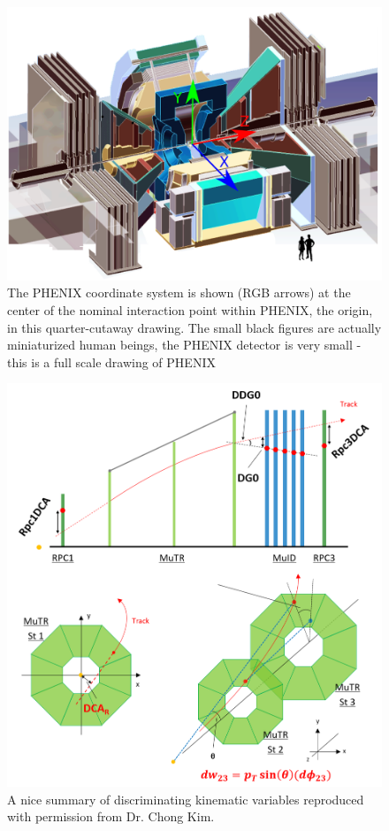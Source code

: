 \begin{figure}
  \centering
  \includegraphics[width=0.8\linewidth]{./figures/phenix_coordinate_system.png}
  \caption{
    The PHENIX coordinate system is shown (RGB arrows) at the center of the
    nominal interaction point within PHENIX, the origin, in this quarter-cutaway
    drawing. The small black figures are actually miniaturized human beings, the
    PHENIX detector is very small - this is a full scale drawing of 
    PHENIX~\cite{WebPHENIXDrawings}
  }
  \label{fig:phenix_coordinate_system}

\end{figure}


\begin{figure}
  \centering
  \includegraphics[width=0.8\linewidth]{./figures/kinematic_variables_schematic.png}
  \caption{
    A nice summary of discriminating kinematic variables reproduced with
    permission from Dr. Chong Kim.
  }

\end{figure}


